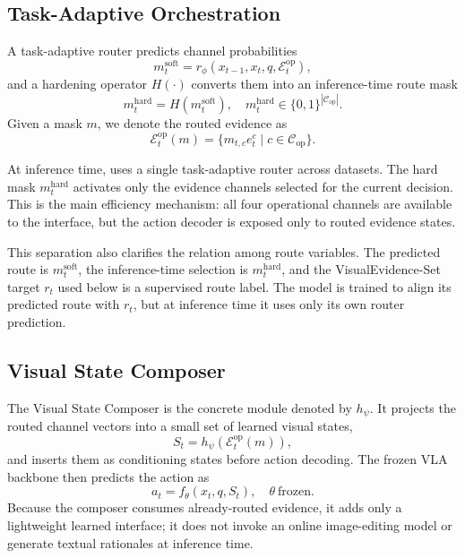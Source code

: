 \subsection{Task-Adaptive Orchestration}

A task-adaptive router predicts channel probabilities
\begin{equation}
m_t^{\mathrm{soft}} = r_{\phi}(x_{t-1}, x_t, q, \mathcal{E}_t^{\mathrm{op}}),
\end{equation}
and a hardening operator $H(\cdot)$ converts them into an inference-time route mask
\begin{equation}
m_t^{\mathrm{hard}} = H(m_t^{\mathrm{soft}}), \quad
m_t^{\mathrm{hard}} \in \{0,1\}^{|\mathcal{C}_{\mathrm{op}}|}.
\end{equation}
Given a mask $m$, we denote the routed evidence as
\begin{equation}
\mathcal{E}_t^{\mathrm{op}}(m)=\{m_{t,c}e_t^c \mid c \in \mathcal{C}_{\mathrm{op}}\}.
\end{equation}

At inference time, \method{} uses a single task-adaptive router across datasets. The hard mask $m_t^{\mathrm{hard}}$ activates only the evidence channels selected for the current decision. This is the main efficiency mechanism: all four operational channels are available to the interface, but the action decoder is exposed only to routed evidence states.

This separation also clarifies the relation among route variables. The predicted route is $m_t^{\mathrm{soft}}$, the inference-time selection is $m_t^{\mathrm{hard}}$, and the VisualEvidence-Set target $r_t$ used below is a supervised route label. The model is trained to align its predicted route with $r_t$, but at inference time it uses only its own router prediction.

\subsection{Visual State Composer}

The Visual State Composer is the concrete module denoted by $h_{\psi}$. It projects the routed channel vectors into a small set of learned visual states,
\begin{equation}
S_t = h_{\psi}(\mathcal{E}_t^{\mathrm{op}}(m)),
\end{equation}
and inserts them as conditioning states before action decoding. The frozen VLA backbone then predicts the action as
\begin{equation}
a_t = f_{\theta}(x_t, q, S_t), \quad \theta \ \text{frozen}.
\end{equation}
Because the composer consumes already-routed evidence, it adds only a lightweight learned interface; it does not invoke an online image-editing model or generate textual rationales at inference time.

